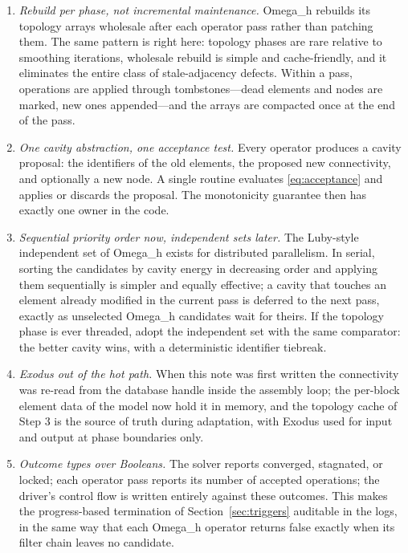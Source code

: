 \documentclass[11pt]{article}
\newcommand{\omegah}{Omega\_h}
\begin{document}
\begin{enumerate}[itemsep=3pt]
\item \emph{Rebuild per phase, not incremental maintenance.} \omegah{}
  rebuilds its topology arrays wholesale after each operator pass
  rather than patching them. The same pattern is right here: topology
  phases are rare relative to smoothing iterations, wholesale rebuild
  is simple and cache-friendly, and it eliminates the entire class of
  stale-adjacency defects. Within a pass, operations are applied
  through tombstones---dead elements and nodes are marked, new ones
  appended---and the arrays are compacted once at the end of the pass.
\item \emph{One cavity abstraction, one acceptance test.} Every operator produces
  a cavity proposal: the identifiers of the old elements, the proposed
  new connectivity, and optionally a new node. A single routine
  evaluates \eqref{eq:acceptance} and applies or discards the proposal. The
  monotonicity guarantee then has exactly one owner in the code.
\item \emph{Sequential priority order now, independent sets later.}
  The Luby-style independent set of \omegah{} exists for distributed
  parallelism. In serial, sorting the candidates by cavity energy in
  decreasing order and applying them sequentially is simpler and
  equally effective; a cavity that touches an element already modified
  in the current pass is deferred to the next pass, exactly as
  unselected \omegah{} candidates wait for theirs. If the topology
  phase is ever threaded, adopt the independent set with the same
  comparator: the better cavity wins, with a deterministic identifier
  tiebreak.
\item \emph{Exodus out of the hot path.} When this note was first
  written the connectivity was re-read from the database handle inside
  the assembly loop; the per-block element data of the model now hold it
  in memory, and the topology cache of Step 3 is the source of truth
  during adaptation, with Exodus used for input and output at phase
  boundaries only.
\item \emph{Outcome types over Booleans.} The solver reports converged,
  stagnated, or locked; each operator pass reports its number of
  accepted operations; the driver's control flow is written entirely
  against these outcomes. This makes the progress-based termination of
  Section~\ref{sec:triggers} auditable in the logs, in the same way
  that each \omegah{} operator returns false exactly when its filter
  chain leaves no candidate.
\end{enumerate}
\end{document}
